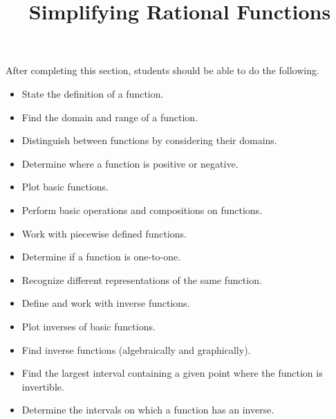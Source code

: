 \documentclass{ximera}
\title{Simplifying Rational Functions}
\begin{document}
\begin{abstract} 
\end{abstract}

\maketitle

\begin{sectionOutcomes}
After completing this section, students should be able to do the following.

\begin{itemize}
	\item State the definition of a function.
	\item Find the domain and range of a function.
	\item Distinguish between functions by considering their domains.
	\item Determine where a function is positive or negative.
	\item Plot basic functions.
        \item Perform basic operations and compositions on
          functions.
        \item Work with piecewise defined functions.
	\item Determine if a function is one-to-one.
	\item Recognize different representations of the same function.
        \item Define and work with inverse functions.
        \item Plot inverses of basic functions.
	\item Find inverse functions (algebraically and graphically).
        \item Find the largest interval containing a given point
          where the function is invertible.
	\item Determine the intervals on which a function has an inverse.

\end{itemize}
\end{sectionOutcomes}
\end{document}
